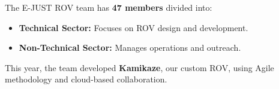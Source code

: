 The E-JUST ROV team has \textbf{47 members} divided into:
\vspace{-0.5\baselineskip}
\begin{itemize}[leftmargin=0pt, itemindent=20pt]
    \setlength{\itemsep}{0pt}
    \item \textbf{Technical Sector:} Focuses on ROV design and development.
    \item \textbf{Non-Technical Sector:} Manages operations and outreach.
\end{itemize}
This year, the team developed \textbf{Kamikaze}, our custom ROV, using Agile methodology and cloud-based collaboration.